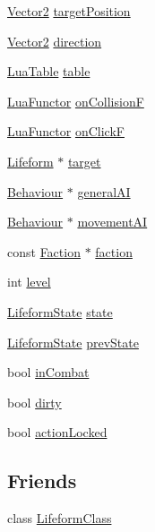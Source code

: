 \begin{DoxyCompactItemize}
\item 
\hyperlink{classZeta_1_1Vector2}{Vector2} \hyperlink{classZeta_1_1Lifeform_a96335354b0e3994fcee2c0c09822862b}{target\+Position}
\item 
\hyperlink{classZeta_1_1Vector2}{Vector2} \hyperlink{classZeta_1_1Lifeform_a8aa9c4a8d9cfa1d52bd8969f122afb22}{direction}
\item 
\hyperlink{classZeta_1_1LuaTable}{Lua\+Table} \hyperlink{classZeta_1_1Lifeform_a21a6e67148dc921adb0ae02af0e8e729}{table}
\item 
\hyperlink{classZeta_1_1LuaFunctor}{Lua\+Functor} \hyperlink{classZeta_1_1Lifeform_aab4cd095bb564432c238e5881e70b3a8}{on\+Collision\+F}
\item 
\hyperlink{classZeta_1_1LuaFunctor}{Lua\+Functor} \hyperlink{classZeta_1_1Lifeform_aa7a2cf0feb73744d6244437f36ce5366}{on\+Click\+F}
\item 
\hyperlink{classZeta_1_1Lifeform}{Lifeform} $\ast$ \hyperlink{classZeta_1_1Lifeform_a1b7a44ef56356f249876dd8be09276ba}{target}
\item 
\hyperlink{classZeta_1_1Behaviour}{Behaviour} $\ast$ \hyperlink{classZeta_1_1Lifeform_a6790b20ddccc8e81cbfcb15e667e95a1}{general\+A\+I}
\item 
\hyperlink{classZeta_1_1Behaviour}{Behaviour} $\ast$ \hyperlink{classZeta_1_1Lifeform_a961bc94bf0ec45e3398799889a1605dc}{movement\+A\+I}
\item 
const \hyperlink{classZeta_1_1Faction}{Faction} $\ast$ \hyperlink{classZeta_1_1Lifeform_a8c2584987801ccc4a85ff7314dc9da02}{faction}
\item 
int \hyperlink{classZeta_1_1Lifeform_aca50d42a46ffaa5e478fb434ccd39e6e}{level}
\item 
\hyperlink{classZeta_1_1LifeformState}{Lifeform\+State} \hyperlink{classZeta_1_1Lifeform_a3b82b64b65c5cd5368207288beac1abe}{state}
\item 
\hyperlink{classZeta_1_1LifeformState}{Lifeform\+State} \hyperlink{classZeta_1_1Lifeform_a1246baf7d5323079611928f07a72a997}{prev\+State}
\item 
bool \hyperlink{classZeta_1_1Lifeform_a7875b195ba7243c864bd56f70d9f27d3}{in\+Combat}
\item 
bool \hyperlink{classZeta_1_1Lifeform_a52679b6d923e5c7ea46f3906a389a222}{dirty}
\item 
bool \hyperlink{classZeta_1_1Lifeform_a6242d7fb4501f142e093968344764715}{action\+Locked}
\end{DoxyCompactItemize}
\subsection*{Friends}
\begin{DoxyCompactItemize}
\item 
class \hyperlink{classZeta_1_1Lifeform_a7ffb604937129303b18f86529c2e146f}{Lifeform\+Class}
\end{DoxyCompactItemize}


